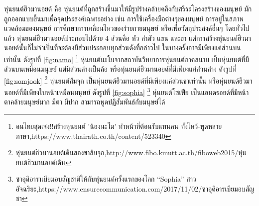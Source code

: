 หุ่นยนต์ฮิวมานอยด์ คือ หุ่นยนต์ที่ถูกสร้างขึ้นมาให้มีรูปร่างคล้ายคลึงกับสรีระโครงสร้างของมนุษย์
มักถูกออกแบบขึ้นมาเพื่อจุดประสงค์เฉพาะอย่าง เช่น การใช้เครื่องมือต่างๆของมนุษย์ การอยู่ในสภาพแวดล้อมของมนุษย์
การศึกษาการเคลื่อนไหวของร่ายกายมนุษย์ หรือเพื่อวัตถุประสงค์อื่นๆ โดยทั่วไปแล้ว หุ่นยนต์ฮิวมานอยด์ประกอบไปด้วย 4 ส่วนคือ หัว ลำตัว แขน
และขา แต่การสร้างหุ่นยนต์ฮิวมานอยด์นั้นก็ไม่จำเป็นที่จะต้องมีส่วนประกอบทุกส่วนดังที่กล่าวไป
ในบางครั้งอาจมีเพียงแค่ส่วนบนเท่านั้น ดังรูปที่ \ref{fig:namo} \footnote{คนไทยสุดเจ๋ง!!สร้างหุ่นยนต์ 'น้องนะโม' ทำหน้าที่ต้อนรับแทนคน ทั้งไหว้-พูดหลายภาษา,https://www.thairath.co.th/content/523340}
หุ่นยนต์นะโมจากสถาบันวิทยาการหุ่นยนต์ภาคสนาม เป็นหุ่นยนต์ที่มีส่วนบนเหมือนมนุษย์ แต่มีส่วนล่างเป็นล้อ หรือหุ่นยนต์ฮิวมานอยด์ที่มีเพียงแค่ส่วนล่าง ดังรูปที่ 
\ref{fig:somjook} \footnote{หุ่นยนต์ฮิวมานอยด์เดินสองขาส้มจุก,http://www.fibo.kmutt.ac.th/fiboweb2015/หุ่นยนต์ฮิวมานอยด์เดิน}
หุ่นยนต์ส้มจุก เป็นหุ่นยนต์ฮิวมานอยด์ที่มีเพียงแค่ส่วนขาเท่านั้น หรือหุ่นยนต์ฮิวมานอยด์ที่มีเพียงใบหน้าเหมือนมนุษย์ ดังรูปที่
\ref{fig:sophia} \footnote{ซาอุดิอาราเบียมอบสัญชาติให้กับหุ่นยนต์ครั้งแรกของโลก “Sophia” สาวอัจฉริยะ,https://www.ensurecommunication.com/2017/11/02/ซาอุดิอารเบียมอบสัญชา}
หุ่นยนต์โซเฟีย เป็นแอนดรอยด์ที่มีหน้าตาคล้ายมนุษย์มาก มีตา มีปาก สามารถพูดปฏิสัมพันธ์กับมนุษย์ได้

